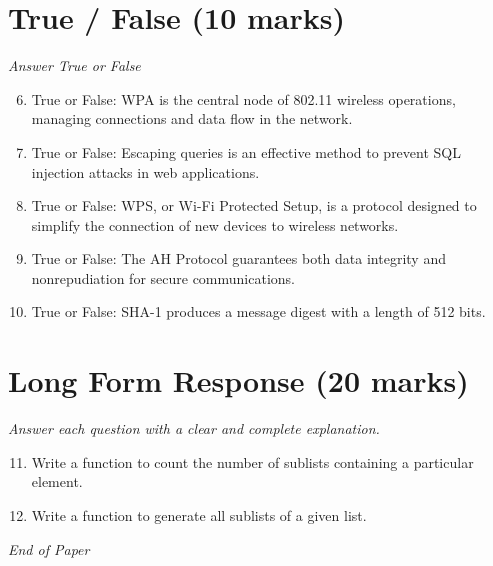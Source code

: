 \documentclass[12pt]{article}
\begin{document}
\section*{True / False (10 marks)}
\textit{Answer True or False}
\begin{enumerate}[label=\arabic*.]
\setcounter{enumi}{5}
\item True or False: WPA is the central node of 802.11 wireless operations, managing connections and data flow in the network.
\item True or False: Escaping queries is an effective method to prevent SQL injection attacks in web applications.
\item True or False: WPS, or Wi-Fi Protected Setup, is a protocol designed to simplify the connection of new devices to wireless networks.
\item True or False: The AH Protocol guarantees both data integrity and nonrepudiation for secure communications.
\item True or False: SHA-1 produces a message digest with a length of 512 bits.
\end{enumerate}

\section*{Long Form Response (20 marks)}
\textit{Answer each question with a clear and complete explanation.}
\begin{enumerate}[label=\arabic*.]
\setcounter{enumi}{10}
\item Write a function to count the number of sublists containing a particular element.
\item Write a function to generate all sublists of a given list.
\end{enumerate}

\vfill
\noindent\textit{End of Paper}
\end{document}
